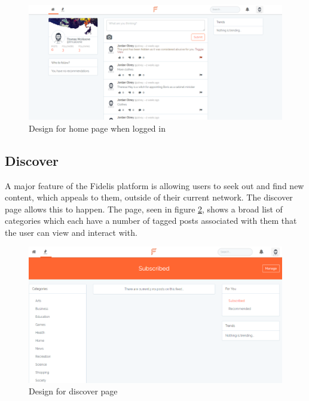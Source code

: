 \begin{figure}[H]
\centering
\includegraphics[width=\linewidth]{Images/Design/home_authorised}
\caption{Design for home page when logged in}
\label{fig:home_authorised}
\end{figure}

\subsection{Discover}
A major feature of the Fidelis platform is allowing users to seek out and find new content, which appeals to them, outside of their current network. The discover page allows this to happen. The page, seen in figure \ref{fig:discover_page}, shows a broad list of categories which each have a number of tagged posts associated with them that the user can view and interact with.

\begin{figure}[H]
\centering
\includegraphics[width=\linewidth]{Images/Design/discover}
\caption{Design for discover page}
\label{fig:discover_page}
\end{figure}

